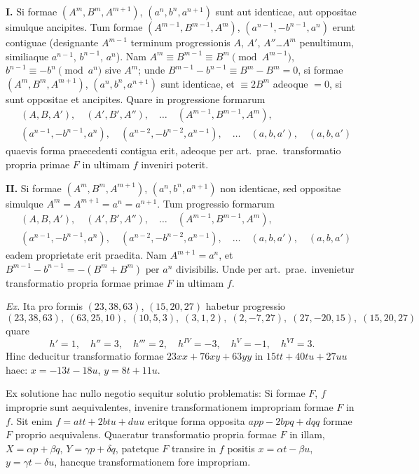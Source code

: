 \documentclass[12pt,a4paper]{article}
\theoremstyle{plain}
\begin{document}
\textbf{I.} Si formae $(A^m, B^m, A^{m+1})$, $(a^n, b^n, a^{n+1})$ sunt aut identicae, aut oppositae simulque ancipites. Tum formae $(A^{m-1}, B^{m-1}, A^m)$, $(a^{n-1}, -b^{n-1}, a^n)$ erunt contiguae (designante $A^{m-1}$ terminum progressionis $A$, $A'$, $A''$\ldots$A^m$ penultimum, similiaque $a^{n-1}$, $b^{n-1}$, $a^n$). Nam $A^m \equiv B^{m-1} \equiv B^m \pmod{A^{m-1}}$, $b^{n-1} \equiv -b^n \pmod{a^n}$ sive $A^m$; unde $B^{m-1} - b^{n-1} \equiv B^m - B^m = 0$, si formae $(A^m, B^m, A^{m+1})$, $(a^n, b^n, a^{n+1})$ sunt identicae, et $\equiv 2B^m$ adeoque $= 0$, si sunt oppositae et ancipites. Quare in progressione formarum
\[
\begin{aligned}
&(A, B, A'), \quad (A', B', A''), \quad \ldots \quad (A^{m-1}, B^{m-1}, A^m),\\
&(a^{n-1}, -b^{n-1}, a^n), \quad (a^{n-2}, -b^{n-2}, a^{n-1}), \quad \ldots \quad (a, b, a'), \quad (a, b, a')
\end{aligned}
\]
quaevis forma praecedenti contigua erit, adeoque per art.~prae.~transformatio propria primae $F$ in ultimam $f$ inveniri poterit.

\textbf{II.} Si formae $(A^m, B^m, A^{m+1})$, $(a^n, b^n, a^{n+1})$ non identicae, sed oppositae simulque $A^m = A^{m+1} = a^n = a^{n+1}$. Tum progressio formarum
\[
\begin{aligned}
&(A, B, A'), \quad (A', B', A''), \quad \ldots \quad (A^{m-1}, B^{m-1}, A^m),\\
&(a^{n-1}, -b^{n-1}, a^n), \quad (a^{n-2}, -b^{n-2}, a^{n-1}), \quad \ldots \quad (a, b, a'), \quad (a, b, a')
\end{aligned}
\]
eadem proprietate erit praedita. Nam $A^{m+1} = a^n$, et $B^{m-1} - b^{n-1} = -(B^m + B^m)$ per $a^n$ divisibilis. Unde per art.~prae.~invenietur transformatio propria formae primae $F$ in ultimam $f$.

\textit{Ex.} Ita pro formis $(23, 38, 63)$, $(15, 20, 27)$ habetur progressio
\[
(23,38,63), \; (63,25,10), \; (10,5,3), \; (3,1,2), \; (2,-7,27), \; (27,-20,15), \; (15,20,27)
\]
quare
\[
h' = 1, \quad h'' = 3, \quad h''' = 2, \quad h^{IV} = -3, \quad h^V = -1, \quad h^{VI} = 3.
\]
Hinc deducitur transformatio formae $23xx + 76xy + 63yy$ in $15tt + 40tu + 27uu$ haec: $x = -13t - 18u$, $y = 8t + 11u$.

Ex solutione hac nullo negotio sequitur solutio problematis: Si formae $F$, $f$ improprie sunt aequivalentes, invenire transformationem impropriam formae $F$ in $f$. Sit enim $f = att + 2btu + duu$ eritque forma opposita $app - 2bpq + dqq$ formae $F$ proprio aequivalens. Quaeratur transformatio propria formae $F$ in illam, $X = \alpha p + \beta q$, $Y = \gamma p + \delta q$, patetque $F$ transire in $f$ positis $x = \alpha t - \beta u$, $y = \gamma t - \delta u$, hancque transformationem fore impropriam.
\end{document}
